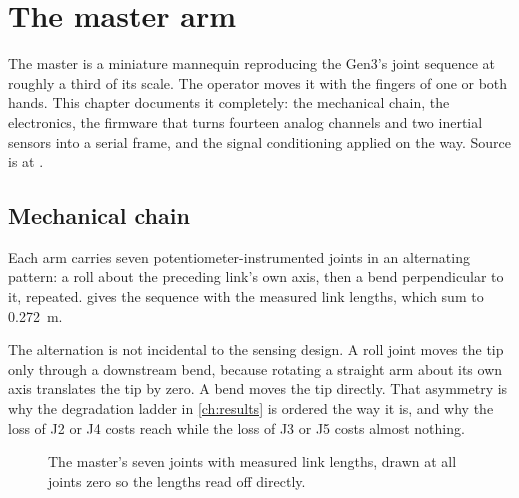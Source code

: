 \chapter{The master arm}
\label{ch:master}

The master is a miniature mannequin reproducing the Gen3's joint sequence at
roughly a third of its scale. The operator moves it with the fingers of one or
both hands. This chapter documents it completely: the mechanical chain, the
electronics, the firmware that turns fourteen analog channels and two inertial
sensors into a serial frame, and the signal conditioning applied on the way.
Source is at .

\section{Mechanical chain}

Each arm carries seven potentiometer-instrumented joints in an alternating
pattern: a roll about the preceding link's own axis, then a bend perpendicular
to it, repeated.  gives the sequence with the measured link
lengths, which sum to \SI{0.272}{\metre}.

The alternation is not incidental to the sensing design. A roll joint moves
the tip only through a downstream bend, because rotating a straight arm about
its own axis translates the tip by zero. A bend moves the tip directly. That
asymmetry is why the degradation ladder in \cref{ch:results} is ordered the
way it is, and why the loss of J2 or J4 costs reach while the loss of J3 or J5
costs almost nothing.

\begin{figure}[htbp]
  \centering
  
  \caption[Master kinematic chain]{The master's seven joints with measured
  link lengths, drawn at all joints zero so the lengths read off directly.}
  \label{fig:kinchain}
\end{figure}

